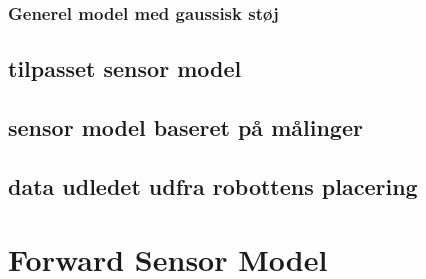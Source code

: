 
\subsubsection{Generel model med gaussisk støj}



\subsection{tilpasset sensor model}



\subsection{sensor model baseret på målinger}



\subsection{data udledet udfra robottens placering}



\section{Forward Sensor Model	}

















\